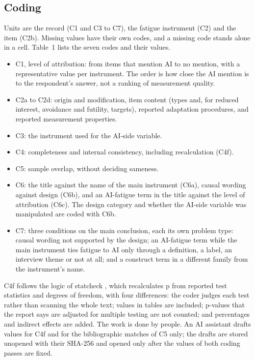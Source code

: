 \documentclass[11pt]{article}
\begin{document}
\subsection{Coding}
Units are the record (C1 and C3 to C7), the fatigue instrument (C2) and the item (C2b). Missing values have their own
codes, and a missing code stands alone in a cell. Table~1 lists the seven codes and their values.
\begin{itemize}
  \item C1, level of attribution: from items that mention AI to no mention, with a representative value per instrument.
  The order is how close the AI mention is to the respondent's answer, not a ranking of measurement quality.
  \item C2a to C2d: origin and modification, item content (types and, for reduced interest, avoidance and futility,
  targets), reported adaptation procedures, and reported measurement properties.
  \item C3: the instrument used for the AI-side variable.
  \item C4: completeness and internal consistency, including recalculation (C4f).
  \item C5: sample overlap, without deciding sameness.
  \item C6: the title against the name of the main instrument (C6a), causal wording against design (C6b), and an
  AI-fatigue term in the title against the level of attribution (C6c). The design category and whether the AI-side
  variable was manipulated are coded with C6b.
  \item C7: three conditions on the main conclusion, each its own problem type: causal wording not supported by the
  design; an AI-fatigue term while the main instrument ties fatigue to AI only through a definition, a label, an
  interview theme or not at all; and a construct term in a different family from the instrument's name.
\end{itemize}
C4f follows the logic of statcheck \citep{nuijten2016}, which recalculates p from reported test statistics and degrees
of freedom, with four differences: the coder judges each test rather than scanning the whole text; values in tables are
included; p-values that the report says are adjusted for multiple testing are not counted; and percentages and indirect
effects are added. The work is done by people. An AI assistant drafts values for C4f and for the bibliographic matches
of C5 only; the drafts are stored unopened with their SHA-256 and opened only after the values of both coding passes
are fixed.
\end{document}
